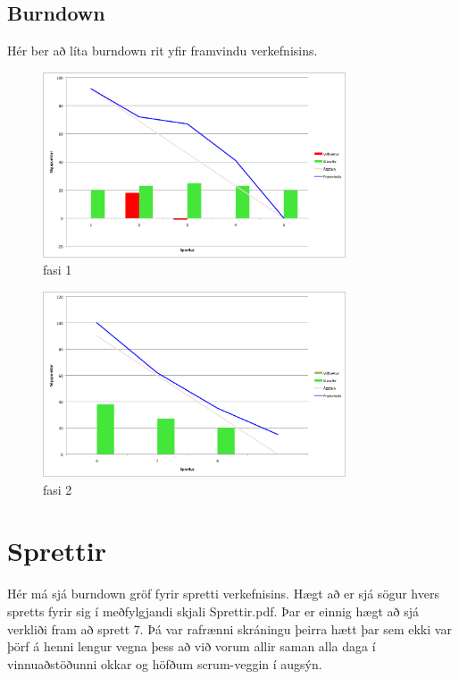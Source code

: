 \documentclass{article}
\begin{document}
\newpage

\subsection{Burndown}
Hér ber að líta burndown rit yfir framvindu verkefnisins.

\begin{figure}[H]
  \centering
  \includegraphics[width=0.8\textwidth]{Fasi1_burndown.png} 
  \caption{fasi 1} 
\end{figure}

\begin{figure}[H]
  \centering
  \includegraphics[width=0.8\textwidth]{Fasi2_burndown.png} 
  \caption{fasi 2} 
\end{figure}

\newpage
\section{Sprettir}
Hér má sjá burndown gröf fyrir spretti verkefnisins. Hægt að er sjá sögur 
hvers spretts fyrir sig í meðfylgjandi skjali Sprettir.pdf. Þar er einnig 
hægt að sjá verkliði fram að sprett 7. Þá var rafrænni skráningu þeirra 
hætt þar sem ekki var þörf á henni lengur vegna þess að við vorum allir saman 
alla daga í vinnuaðstöðunni okkar og höfðum scrum-veggin í augsýn.
\end{document}
